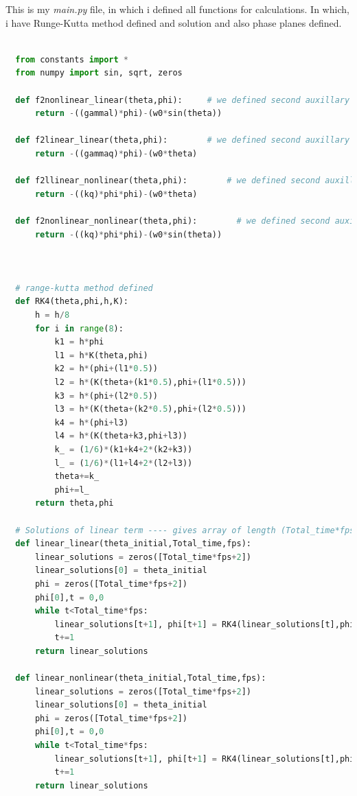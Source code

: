 \documentclass[11pt,a4paper]{article}
\begin{document}
This is my \emph{main.py} file, in which i defined all functions for calculations. In which, i have Runge-Kutta method defined and solution and also phase planes defined.

\begin{lstlisting}[language=Python]

  from constants import *
  from numpy import sin, sqrt, zeros

  def f2nonlinear_linear(theta,phi):     # we defined second auxillary equation from nonlinear term.
      return -((gammal)*phi)-(w0*sin(theta))

  def f2linear_linear(theta,phi):        # we defined second auxillary equation from linear term.
      return -((gammaq)*phi)-(w0*theta)

  def f2llinear_nonlinear(theta,phi):        # we defined second auxillary equation from linear term.
      return -((kq)*phi*phi)-(w0*theta)

  def f2nonlinear_nonlinear(theta,phi):        # we defined second auxillary equation from linear term.
      return -((kq)*phi*phi)-(w0*sin(theta))



  # range-kutta method defined
  def RK4(theta,phi,h,K): 
      h = h/8
      for i in range(8):
          k1 = h*phi
          l1 = h*K(theta,phi)
          k2 = h*(phi+(l1*0.5))
          l2 = h*(K(theta+(k1*0.5),phi+(l1*0.5)))
          k3 = h*(phi+(l2*0.5))
          l3 = h*(K(theta+(k2*0.5),phi+(l2*0.5)))
          k4 = h*(phi+l3)
          l4 = h*(K(theta+k3,phi+l3))
          k_ = (1/6)*(k1+k4+2*(k2+k3))
          l_ = (1/6)*(l1+l4+2*(l2+l3))
          theta+=k_
          phi+=l_
      return theta,phi

  # Solutions of linear term ---- gives array of length (Total_time*fps)
  def linear_linear(theta_initial,Total_time,fps):
      linear_solutions = zeros([Total_time*fps+2])
      linear_solutions[0] = theta_initial
      phi = zeros([Total_time*fps+2])
      phi[0],t = 0,0
      while t<Total_time*fps:
          linear_solutions[t+1], phi[t+1] = RK4(linear_solutions[t],phi[t],1/fps,f2linear_linear)
          t+=1
      return linear_solutions

  def linear_nonlinear(theta_initial,Total_time,fps):
      linear_solutions = zeros([Total_time*fps+2])
      linear_solutions[0] = theta_initial
      phi = zeros([Total_time*fps+2])
      phi[0],t = 0,0
      while t<Total_time*fps:
          linear_solutions[t+1], phi[t+1] = RK4(linear_solutions[t],phi[t],1/fps,f2llinear_nonlinear)
          t+=1
      return linear_solutions


\end{lstlisting}
\end{document}
